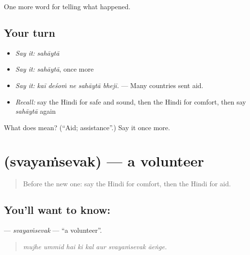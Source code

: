 \begin{grammarlens}[title={What you've built}]
One more word for telling what happened.
\end{grammarlens}

\subsection*{Your turn}
\begin{itemize}
\raggedright
  \item \emph{Say it:} \emph{sahāytā}
  \item \emph{Say it:} \emph{sahāytā}, once more
  \item \emph{Say it:} \emph{kaī deśoṁ ne sahāytā bhejī.} — Many countries sent aid.
  \item \emph{Recall:} say the Hindi for safe and sound, then the Hindi for comfort, then say \emph{sahāytā} again
\end{itemize}

\begin{tcolorbox}[breakable,colback=teal!4,colframe=teal!35!black,title={Before you move on}]
What does  mean? (\textquotedblleft{}Aid; assistance\textquotedblright{}.) Say it once more.
\end{tcolorbox}
\section[\texorpdfstring{\hi{स्वयंसेवक} (svayaṁsevak)}{स्वयंसेवक (svayaṁsevak)}]{ (svayaṁsevak) — a volunteer}

\label{lesson:HI-C311-svayamsevak}



\begin{quote}
Before the new one: say the Hindi for comfort, then the Hindi for aid.
\end{quote}

\subsection*{You'll want to know: }
\textbf{} — \emph{svayaṁsevak} — \textquotedblleft{}a volunteer\textquotedblright{}.

\begin{quote}
       
\end{quote}

\begin{quote}
\emph{mujhe ummīd hai ki kal aur svayaṁsevak āeṅge.}
\end{quote}


